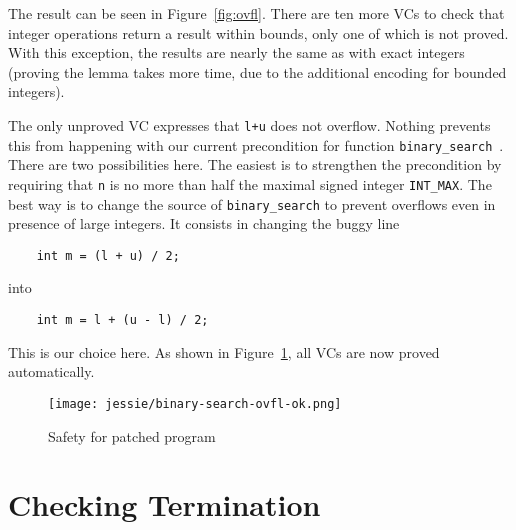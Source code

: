 \documentclass[a4paper,11pt,twoside,openright]{report}
\begin{document}
The result can be seen in Figure~\ref{fig:ovfl}. There are ten more VCs
to check that integer operations return a result within bounds, only one of
which is not proved. With this exception, the results are nearly the same
as with exact integers (proving the lemma takes more time, due
to the additional encoding for bounded integers).

The only unproved VC expresses that \verb|l+u| does not overflow. 
Nothing prevents this from happening with our current
precondition for function \verb|binary_search|~\cite{Tuch_KN_07}. There are two
possibilities here. The easiest is to strengthen the precondition
by requiring that \verb|n| is no more than half the maximal signed
integer \verb|INT_MAX|. The best way is to change the source of
\verb|binary_search| to prevent overflows even in presence of large
integers. It consists in changing the buggy line

\begin{verbatim}
    int m = (l + u) / 2;
\end{verbatim}

into

\begin{verbatim}
    int m = l + (u - l) / 2;
\end{verbatim}

This is our choice here. As shown in Figure~\ref{fig:ovfl-ok}, all VCs
are now proved automatically.

\begin{figure}[t]
  \begin{center}
    \texttt{[image: jessie/binary-search-ovfl-ok.png]}
  \end{center}
  \caption{Safety for patched program}
  \label{fig:ovfl-ok}
  \hrulefill
\end{figure}





\section{Checking Termination}
\end{document}
